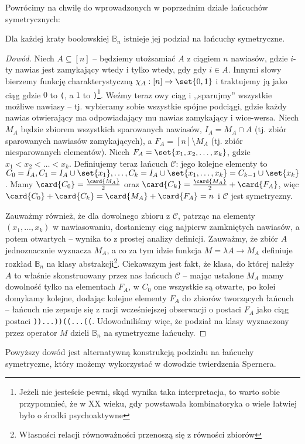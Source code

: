 Powrócimy na chwilę do wprowadzonych w poprzednim dziale łańcuchów symetrycznych:
\begin{theorem}
	Dla każdej kraty boolowskiej $\mathbb B_n$ istnieje jej podział na łańcuchy symetryczne.
\end{theorem}
\begin{proof}[Dowód]
	Niech $A \subseteq [n]$ -- będziemy utożsamiać $A$ z ciągiem $n$ nawiasów, gdzie
	$i$-ty nawias jest zamykający wtedy i tylko wtedy, gdy gdy $i \in A$. Innymi słowy
	bierzemy funkcję charakterystyczną $\chi_A: [n] \to \set{0, 1}$ i traktujemy
	ją jako ciąg gdzie $0$ to \texttt{(}, a $1$ to \texttt{)}\footnote{Jeżeli nie jesteście pewni,
		skąd wynika taka interpretacja, to warto sobie przypomnieć, że w XX wieku, gdy
		powstawała kombinatoryka o wiele łatwiej było o środki psychoaktywne}. Weźmy teraz owy ciąg i ,,sparujmy''
	wszystkie możliwe nawiasy -- tj. wybieramy sobie wszystkie spójne podciągi,
	gdzie każdy nawias otwierający ma odpowiadający mu nawias zamykający i wice-wersa.
	Niech $M_A$ będzie zbiorem wszystkich sparowanych nawiasów, $I_A = M_A \cap A$
	(tj. zbiór sparowanych nawiasów zamykających), a $F_A = [n] \setminus M_A$ (tj. zbiór niesparowanych elementów).
	Niech $F_A = \set{x_1, x_2, \ldots, x_k}$, gdzie $x_1 < x_2 < \ldots < x_k$.
	Definiujemy teraz łańcuch $\mathcal C$: jego kolejne elementy to $C_0 =
		I_A, C_1 = I_A\cup\set{x_1}, \ldots, C_k = I_A\cup\set{x_1,\ldots,x_k} = C_{k-1} \cup \set{x_k}$.
	Mamy $\card{C_0} = \frac{\card{M_A}}2$ oraz $\card{C_k} = \frac{\card{M_A}}2 +
		\card{F_A}$, więc $\card{C_0}+\card{C_k} = \card{M_A}+\card{F_A} = n$ i $\mathcal C$ jest symetryczny.

	Zauważmy również, że dla dowolnego zbioru z $\mathcal C$, patrząc na elementy $(x_1,\ldots,x_k)$
	w nawiasowaniu, dostaniemy ciąg najpierw zamkniętych nawiasów, a potem otwartych -- wynika to z prostej analizy definicji.
	Zauważmy, że zbiór $A$ jednoznacznie wyznacza $M_A$, a co za tym idzie funkcja $M = \lambda A \to M_A$ definiuje
	rozkład $\mathbb B_n$ na klasy abstrakcji\footnote{Własności relacji równoważności przenoszą się z równości zbiorów}.
	Ciekawszym jest fakt, że klasa, do której należy $A$ to właśnie skonstruowany przez nas łańcuch $\mathcal C$
	-- mając ustalone $M_A$ mamy dowolność tylko na elementach $F_A$,
	w $C_0$ one wszystkie są otwarte, po kolei domykamy kolejne, dodając kolejne elementy $F_A$
	do zbiorów tworzących łańcuch -- łańcuch nie zepsuje się z racji wcześniejszej obserwacji
	o postaci $F_A$ jako ciąg postaci \texttt{))...))((...((}.
	Udowodniliśmy więc, że podział na klasy wyznaczony przez operator $M$ dzieli $\mathbb B_n$ na symetryczne łańcuchy.
\end{proof}
Powyższy dowód jest alternatywną konstrukcją podziału na łańcuchy symetryczne, który możemy wykorzystać
w dowodzie twierdzenia Spernera.


